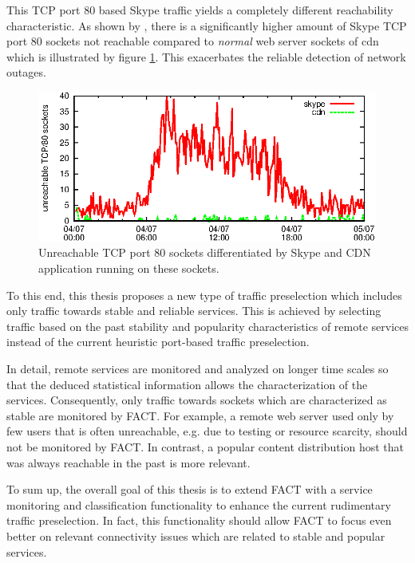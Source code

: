 This \gls{TCP} port 80 based Skype traffic yields a completely different reachability characteristic. As shown by \citet{SchatzmanThesis2012}, there is a significantly higher amount of Skype \gls{TCP} port 80 sockets not reachable compared to \emph{normal} web server sockets of \gls{cdn} which is illustrated by figure \ref{fig:skype_traffic}. This exacerbates the reliable detection of network outages. 

\begin{figure}
	[ht] \centering
	\includegraphics[width=12cm]{images/application_fact.eps}
	\caption{Unreachable TCP port 80 sockets differentiated by Skype and CDN application running on these sockets. \citep{SchatzmanThesis2012}} 
	\label{fig:skype_traffic}
\end{figure}

To this end, this thesis proposes a new type of traffic preselection which includes only traffic towards stable and reliable services. This is achieved by selecting traffic based on the past stability and popularity characteristics of remote services instead of the current heuristic port-based traffic preselection.

In detail, remote services are monitored and analyzed on longer time scales so that the deduced statistical information allows the characterization of the services. Consequently, only traffic towards sockets which are characterized as stable are monitored by \gls{FACT}. For example, a remote web server used only by few users that is often unreachable, e.g. due to testing or resource scarcity, should not be monitored by \gls{FACT}. In contrast, a popular content distribution host that was always reachable in the past is more relevant. 

To sum up, the overall goal of this thesis is to extend \gls{FACT} with a service monitoring and classification functionality to enhance the current rudimentary traffic preselection. In fact, this functionality should allow \gls{FACT} to focus even better on relevant connectivity issues which are related to stable and popular services.


